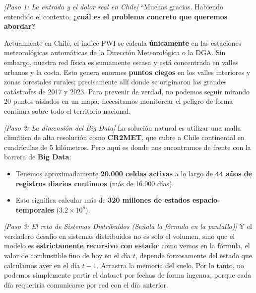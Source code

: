 \documentclass[12pt,a4paper]{article}
\begin{document}
\begin{speechbox}

\noindent \textit{[Paso 1: La entrada y el dolor real en Chile]}  
\noindent ``Muchas gracias. Habiendo entendido el contexto, \textbf{¿cuál es el problema concreto que queremos abordar?}

\vspace{0.3cm}
\noindent Actualmente en Chile, el índice FWI se calcula \textbf{únicamente} en las estaciones meteorológicas automáticas de la Dirección Meteorológica o la DGA. Sin embargo, nuestra red física es sumamente escasa y está concentrada en valles urbanos y la costa. Esto genera enormes \textbf{puntos ciegos} en los valles interiores y zonas forestales rurales; precisamente allí donde se originaron las grandes catástrofes de 2017 y 2023. Para prevenir de verdad, no podemos seguir mirando 20 puntos aislados en un mapa: necesitamos monitorear el peligro de forma continua sobre todo el territorio nacional.

\vspace{0.3cm}
\noindent \textit{[Paso 2: La dimensión del Big Data]}  
\noindent La solución natural es utilizar una malla climática de alta resolución como \textbf{CR2MET}, que cubre a Chile continental en cuadrículas de 5 kilómetros. Pero aquí es donde nos encontramos de frente con la barrera de \textbf{Big Data}:
\begin{itemize}[leftmargin=5mm, itemsep=2pt]
    \item Tenemos aproximadamente \textbf{20.000 celdas activas} a lo largo de \textbf{44 años de registros diarios continuos} (más de 16.000 días).
    \item Esto significa calcular más de \textbf{320 millones de estados espacio-temporales} ($3.2 \times 10^8$).
\end{itemize}

\vspace{0.3cm}
\noindent \textit{[Paso 3: El reto de Sistemas Distribuidos (Señala la fórmula en la pantalla)]}  
\noindent Y el verdadero desafío en sistemas distribuidos no es solo el volumen, sino que el modelo es \textbf{estrictamente recursivo con estado}: como vemos en la fórmula, el valor de combustible fino de hoy en el día $t$, depende forzosamente del estado que calculamos ayer en el día $t-1$. Arrastra la memoria del suelo. Por lo tanto, no podemos simplemente partir el dataset por fechas de forma ingenua, porque cada día requeriría comunicarse por red con el día anterior.


\end{speechbox}
\end{document}

